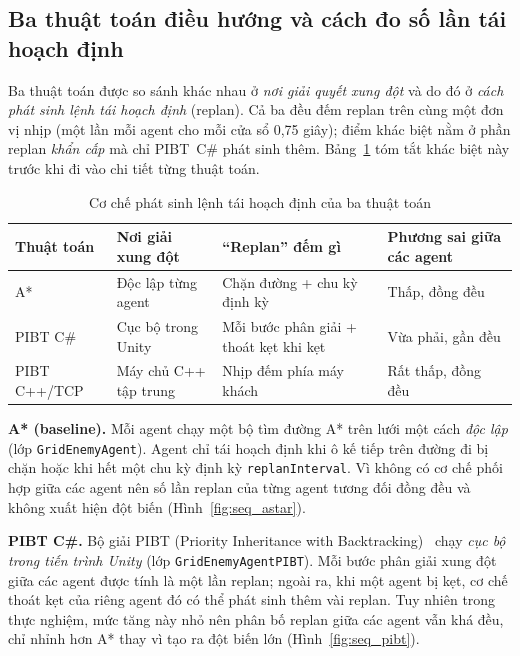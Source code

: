 \documentclass[../DoAn.tex]{subfiles}
\begin{document}
\subsection{Ba thuật toán điều hướng và cách đo số lần tái hoạch định}
\label{subsec:three_algos}

Ba thuật toán được so sánh khác nhau ở \emph{nơi giải quyết xung đột} và do đó ở \emph{cách phát
sinh lệnh tái hoạch định} (replan). Cả ba đều đếm replan trên cùng một đơn vị nhịp (một lần mỗi
agent cho mỗi cửa sổ 0,75 giây); điểm khác biệt nằm ở phần replan \emph{khẩn cấp} mà chỉ PIBT~C\#
phát sinh thêm. Bảng~\ref{tab:replan_mechanism} tóm tắt khác biệt này trước khi đi vào chi tiết
từng thuật toán.

\begin{table}[htbp]
\centering
\caption{Cơ chế phát sinh lệnh tái hoạch định của ba thuật toán}
\label{tab:replan_mechanism}
\small
\begin{tabular}{>{\raggedright\arraybackslash}p{2.4cm}>{\raggedright\arraybackslash}p{3.3cm}>{\raggedright\arraybackslash}p{4.3cm}>{\raggedright\arraybackslash}p{2.7cm}}
\hline
\textbf{Thuật toán} & \textbf{Nơi giải xung đột} & \textbf{``Replan'' đếm gì} & \textbf{Phương sai giữa các agent} \\ \hline
A*           & Độc lập từng agent    & Chặn đường + chu kỳ định kỳ              & Thấp, đồng đều \\
PIBT C\#     & Cục bộ trong Unity    & Mỗi bước phân giải + thoát kẹt khi kẹt  & Vừa phải, gần đều \\
PIBT C++/TCP & Máy chủ C++ tập trung & Nhịp đếm phía máy khách                 & Rất thấp, đồng đều \\ \hline
\end{tabular}
\end{table}

\textbf{A* (baseline).} Mỗi agent chạy một bộ tìm đường A* trên lưới một cách \emph{độc lập} (lớp
\texttt{GridEnemyAgent}). Agent chỉ tái hoạch định khi ô kế tiếp trên đường đi bị chặn hoặc khi
hết một chu kỳ định kỳ \texttt{replanInterval}. Vì không có cơ chế phối hợp giữa các agent nên số
lần replan của từng agent tương đối đồng đều và không xuất hiện đột biến (Hình~\ref{fig:seq_astar}).

\textbf{PIBT C\#.} Bộ giải PIBT (Priority Inheritance with Backtracking)~\cite{okumura2022pibt}
chạy \emph{cục bộ trong tiến trình Unity} (lớp \texttt{GridEnemyAgentPIBT}). Mỗi bước phân giải
xung đột giữa các agent được tính là một lần replan; ngoài ra, khi một agent bị kẹt, cơ chế thoát
kẹt của riêng agent đó có thể phát sinh thêm vài replan. Tuy nhiên trong thực nghiệm, mức tăng
này nhỏ nên phân bố replan giữa các agent vẫn khá đều, chỉ nhỉnh hơn A* thay vì tạo ra đột biến
lớn (Hình~\ref{fig:seq_pibt}).
\end{document}
